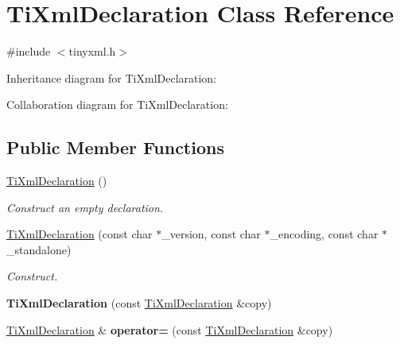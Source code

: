 \hypertarget{class_ti_xml_declaration}{
\section{\-Ti\-Xml\-Declaration \-Class \-Reference}
\label{class_ti_xml_declaration}
}


{\ttfamily \#include $<$tinyxml.\-h$>$}



\-Inheritance diagram for \-Ti\-Xml\-Declaration\-:


\-Collaboration diagram for \-Ti\-Xml\-Declaration\-:
\subsection*{\-Public \-Member \-Functions}
\begin{DoxyCompactItemize}
\item 
\hypertarget{class_ti_xml_declaration_aa0484d059bea0ea1acb47c9094382d79}{
\hyperlink{class_ti_xml_declaration_aa0484d059bea0ea1acb47c9094382d79}{\-Ti\-Xml\-Declaration} ()}
\label{class_ti_xml_declaration_aa0484d059bea0ea1acb47c9094382d79}

\begin{DoxyCompactList}\small\item\em \-Construct an empty declaration. \end{DoxyCompactList}\item 
\hypertarget{class_ti_xml_declaration_a3b618d1c30c25e4b7a71f31a595ee298}{
\hyperlink{class_ti_xml_declaration_a3b618d1c30c25e4b7a71f31a595ee298}{\-Ti\-Xml\-Declaration} (const char $\ast$\-\_\-version, const char $\ast$\-\_\-encoding, const char $\ast$\-\_\-standalone)}
\label{class_ti_xml_declaration_a3b618d1c30c25e4b7a71f31a595ee298}

\begin{DoxyCompactList}\small\item\em \-Construct. \end{DoxyCompactList}\item 
\hypertarget{class_ti_xml_declaration_a58ac9042c342f7845c8491da0bb091e8}{
{\bfseries \-Ti\-Xml\-Declaration} (const \hyperlink{class_ti_xml_declaration}{\-Ti\-Xml\-Declaration} \&copy)}
\label{class_ti_xml_declaration_a58ac9042c342f7845c8491da0bb091e8}

\item 
\hypertarget{class_ti_xml_declaration_a3bc617efe11014ff2b1a9c5727c37a9a}{
\hyperlink{class_ti_xml_declaration}{\-Ti\-Xml\-Declaration} \& {\bfseries operator=} (const \hyperlink{class_ti_xml_declaration}{\-Ti\-Xml\-Declaration} \&copy)}
\label{class_ti_xml_declaration_a3bc617efe11014ff2b1a9c5727c37a9a}


\end{DoxyCompactItemize}
